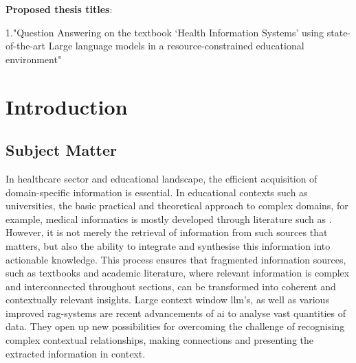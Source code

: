 \textbf{Proposed thesis titles}:

1."Question Answering on the textbook ‘Health Information Systems’ using state-of-the-art Large language models in a resource-constrained educational environment"
%
\chapter{Introduction}\label{ch:introduction}
\section{Subject Matter}\label{sec:subject matter}
In healthcare sector and educational landscape, the efficient acquisition of domain-specific information is essential. 
In educational contexts such as universities, the basic practical and theoretical approach to complex domains, for example, medical informatics is mostly developed through literature such as \citet{bb2}.
However, it is not merely the retrieval of information from such sources that matters, but also the ability to integrate and synthesise this information into actionable knowledge.
This process ensures that fragmented information sources, such as textbooks and academic literature, where relevant information is complex and interconnected throughout sections, can be transformed into coherent and contextually relevant insights.
%
Large context window \ac{llm}'s, as well as various improved \ac{rag}-systems are recent advancements of \ac{ai} to analyse vast quantities of data.
They open up new possibilities for overcoming the challenge of recognising complex contextual relationships, making connections and presenting the extracted information in context.
%
